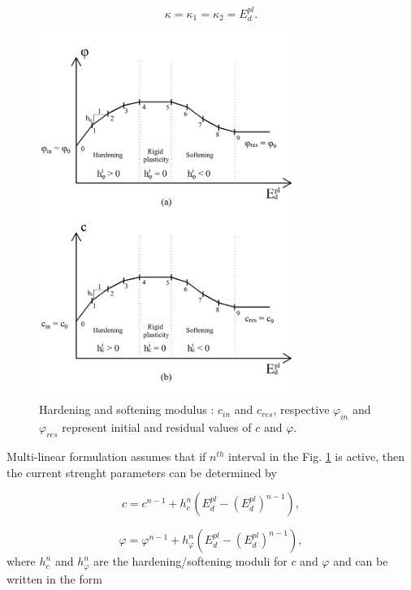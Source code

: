 \begin{equation}\label{eq:kappa}
	\kappa = \kappa_{1} = \kappa_{2} = E_d^{pl}.
\end{equation}

\begin{figure}[h!]
	\centering	
	\includegraphics[width=0.75\textwidth, angle=0]{obrazky/hardening_softening_modulus_my.png}
	\caption[Hardening and softening modulus]{Hardening and softening modulus \cite{geofem}: $c_{in}$ and $c_{res}$, respective $\varphi_{in}$ and $\varphi_{res}$ represent initial and residual values of $c$ and $\varphi$.} \label{obr:H}
\end{figure}
 
Multi-linear formulation assumes that if $n^{th}$ interval in the Fig. \ref{obr:H} is active, then the current strenght parameters can be determined by

\begin{equation}\label{eq:c}
	c = c^{n-1} + h_c^n \left( E_d^{pl} -(E_d^{pl})^{n-1} \right),
\end{equation}

\begin{equation}\label{eq:phi}
\varphi = \varphi^{n-1} + h_\varphi^n\left( E_d^{pl} - (E_d^{pl})^{n-1} \right),
\end{equation}
where $h_c^n$ and $h_\varphi^n$ are the hardening/softening moduli for $c$ and $\varphi$ and can be written in the form


